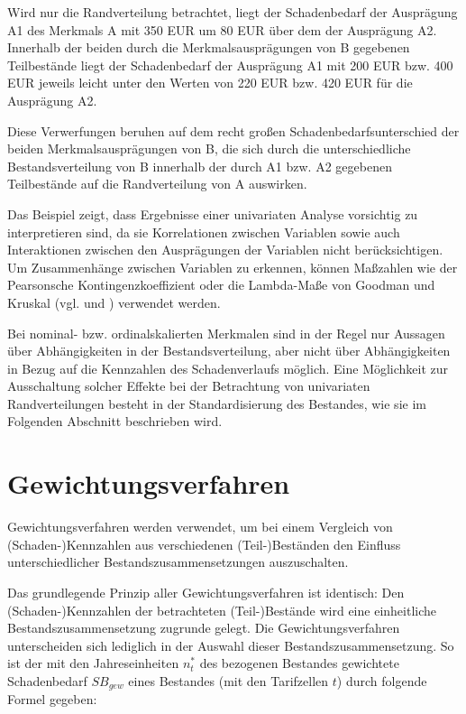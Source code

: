 Wird nur die Randverteilung betrachtet, liegt der Schadenbedarf der Ausprägung A1 des Merkmals A mit 350 EUR um 80 EUR über dem der Ausprägung A2. Innerhalb der beiden durch die Merkmalsausprägungen von B gegebenen Teilbestände liegt der Schadenbedarf der Ausprägung A1 mit 200 EUR bzw. 400 EUR jeweils leicht unter den Werten von 220 EUR bzw. 420 EUR für die Ausprägung A2.

Diese Verwerfungen beruhen auf dem recht großen Schadenbedarfsunterschied der beiden Merkmalsausprägungen von B, die sich durch die unterschiedliche Bestandsverteilung von B innerhalb der durch A1 bzw. A2 gegebenen Teilbestände auf die Randverteilung von A auswirken.

Das Beispiel zeigt, dass Ergebnisse einer univariaten Analyse vorsichtig zu interpretieren sind, da sie Korrelationen zwischen Variablen sowie auch Interaktionen zwischen den Ausprägungen der Variablen nicht berücksichtigen.
Um Zusammenhänge zwischen Variablen zu erkennen, können Maßzahlen wie der Pearsonsche Kontingenzkoeffizient oder die Lambda-Maße von Goodman und Kruskal (vgl. \cite{Rinne} und \cite{Hartung}) verwendet werden.

Bei nominal- bzw. ordinalskalierten Merkmalen sind in der Regel nur Aussagen über Abhängigkeiten in der Bestandsverteilung, aber nicht über Abhängigkeiten in Bezug auf die Kennzahlen des Schadenverlaufs möglich.
Eine Möglichkeit zur Ausschaltung solcher Effekte bei der Betrachtung von univariaten Randverteilungen besteht in der Standardisierung des Bestandes, wie sie im Folgenden Abschnitt beschrieben wird.





\section{Gewichtungsverfahren} \label{Gewichtungsverfahren}%

Gewichtungsverfahren werden verwendet, um bei einem Vergleich von (Schaden-)Kennzahlen aus verschiedenen (Teil-)Beständen den Einfluss unterschiedlicher Bestandszusammensetzungen auszuschalten.

Das grundlegende Prinzip aller Gewichtungsverfahren ist identisch: Den (Schaden-)Kennzahlen der betrachteten (Teil-)Bestände wird eine einheitliche Bestandszusammensetzung zugrunde gelegt. Die Gewichtungsverfahren unterscheiden sich lediglich in der Auswahl dieser Bestandszusammensetzung.
So ist der mit den Jahreseinheiten $n^*_t$  des bezogenen Bestandes gewichtete Schadenbedarf $SB_{gew}$ eines Bestandes (mit den Tarifzellen $t$) durch folgende Formel gegeben:

